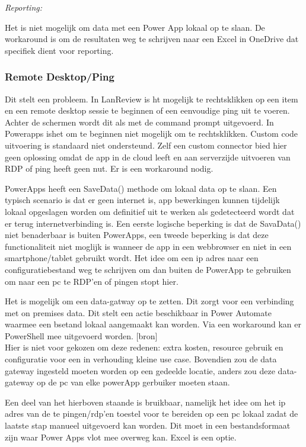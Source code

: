 \textit{Reporting:}

Het is niet mogelijk om data met een Power App lokaal op te slaan. De workaround is om de resultaten weg te schrijven naar een Excel in OneDrive dat specifiek dient voor reporting.

\subsubsection{Remote Desktop/Ping}

Dit stelt een probleem. In LanReview is ht mogelijk te rechtsklikken op een item en een remote desktop sessie te beginnen of een eenvoudige ping uit te voeren. Achter de schermen wordt dit als met de command prompt uitgevoerd. In Powerapps ishet om te beginnen niet mogelijk om te rechtsklikken. Custom code uitvoering is standaard niet ondersteund. Zelf een custom connector bied hier geen oplossing omdat de app in de cloud leeft en aan serverzijde uitvoeren van RDP of ping heeft geen nut. Er is een workaround nodig.

PowerApps heeft een SaveData() methode om lokaal data op te slaan. Een typisch scenario is dat er geen internet is, app bewerkingen kunnen tijdelijk lokaal opgeslagen worden om definitief uit te werken als gedetecteerd wordt dat er terug internetverbinding is. Een eerste logische beperking is dat de SavaData() niet benaderbaar is buiten PowerApps, een tweede beperking is dat deze functionaliteit niet moglijk is wanneer de app in een webbrowser en niet in een smartphone/tablet gebruikt wordt. Het idee om een ip adres naar een configuratiebestand weg te schrijven om dan buiten de PowerApp te gebruiken om naar een pc te RDP'en of pingen stopt hier.

Het is mogelijk om een data-gatway op te zetten. Dit zorgt voor een verbinding met on premises data. Dit stelt een actie beschikbaar in Power Automate waarmee een bsetand lokaal aangemaakt kan worden. Via een workaround kan er PowerShell mee uitgevoerd worden. [bron]\\
Hier is niet voor gekozen om deze redenen: extra kosten, resource gebruik en configuratie voor een in verhouding kleine use case. Bovendien zou de data gateway ingesteld moeten worden op een gedeelde locatie, anders zou deze data-gateway op de pc van elke powerApp gerbuiker moeten staan.

Een deel van het hierboven staande is bruikbaar, namelijk het idee om het ip adres van de te pingen/rdp'en toestel voor te bereiden op een pc lokaal zadat de laatste stap manueel uitgevoerd kan worden. Dit moet in een bestandsformaat zijn waar Power Apps vlot mee overweg kan. Excel is een optie.

